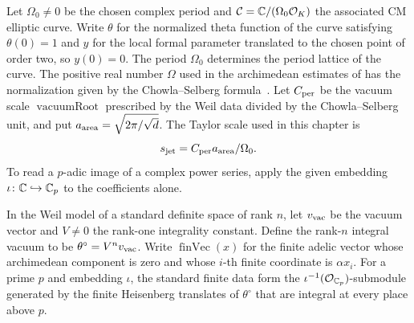 Let $\Omega_0\ne0$ be the chosen complex period and $\mathcal C=\mathbb{C}/(\Omega_0\mathcal{O}_K)$ the associated CM elliptic curve. Write $\theta$ for the normalized theta function of the curve satisfying $\theta(0)=1$ and $y$ for the local formal parameter translated to the chosen point of order two, so $y(0)=0$. The period $\Omega_0$ determines the period lattice of the curve. The positive real number $\Omega$ used in the archimedean estimates of  has the normalization given by the Chowla--Selberg formula~\cite{SelbergChowla1967}. Let $C_{\rm per}$ be the vacuum scale $\operatorname{vacuumRoot}$ prescribed by the Weil data divided by the Chowla--Selberg unit, and put $a_{\rm area}=\sqrt{2\pi/\sqrt d}$. The Taylor scale used in this chapter is
\begin{equation}
\label{eq:ch2-jet-scale}
 s_{\rm jet}=C_{\rm per}a_{\rm area}/\Omega_0.
\end{equation}
To read a $p$-adic image of a complex power series, apply the given embedding $\iota\colon\mathbb{C}\hookrightarrow\mathbb{C}_p$ to the coefficients alone.

\begin{definition}
\label{def:ch2-int-vacuum}
\emitthmsource
In the Weil model of a standard definite space of rank $n$, let $v_{\rm vac}$ be the vacuum vector and $V\ne0$ the rank-one integrality constant. Define the rank-$n$ integral vacuum to be $\theta^\circ=V^n v_{\rm vac}$. Write $\operatorname{finVec}(x)$ for the finite adelic vector whose archimedean component is zero and whose $i$-th finite coordinate is $\alpha x_i$. For a prime $p$ and embedding $\iota$, the standard finite data form the $\iota^{-1}(\mathcal{O}_{\mathbb{C}_p})$-submodule generated by the finite Heisenberg translates of $\theta^\circ$ that are integral at every place above $p$.
\end{definition}

